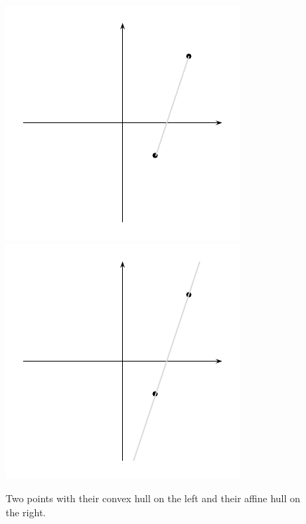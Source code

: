 \begin{frame}
  
\begin{figure}[htbp]
  \begin{center}{
      \includegraphics{../figures/picture2-1.pdf} 
      \hfill
      \includegraphics{../figures/picture2-2.pdf} 
    }
    
  \end{center}
  \caption{Two points with their convex hull on the left and  their
    affine hull on the right. }\label{conv:fig:1}
\end{figure}
\end{frame}



